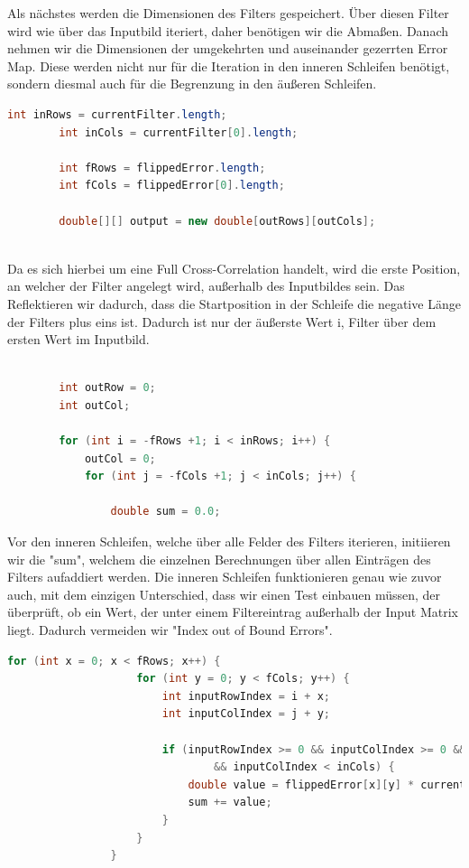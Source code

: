 \documentclass[12pt]{article}
\begin{document}
Als nächstes werden die Dimensionen des Filters gespeichert. Über diesen Filter wird wie über das Inputbild iteriert, daher benötigen wir die Abmaßen. Danach nehmen wir die Dimensionen der umgekehrten und auseinander gezerrten Error Map. Diese werden nicht nur für die Iteration in den inneren Schleifen benötigt, sondern diesmal auch für die Begrenzung in den äußeren Schleifen. 
\begin{lstlisting}[language=Java]
        int inRows = currentFilter.length;
        int inCols = currentFilter[0].length;

        int fRows = flippedError.length;
        int fCols = flippedError[0].length;

        double[][] output = new double[outRows][outCols];
        
\end{lstlisting}
        Da es sich hierbei um eine Full Cross-Correlation handelt, wird die erste Position, an welcher der Filter angelegt wird, außerhalb des Inputbildes sein. Das Reflektieren wir dadurch, dass die Startposition in der Schleife die negative Länge der Filters plus eins ist. Dadurch ist nur der äußerste Wert i, Filter über dem ersten Wert im Inputbild.
\begin{lstlisting}[language=Java]

        int outRow = 0;
        int outCol;

        for (int i = -fRows +1; i < inRows; i++) {
            outCol = 0;
            for (int j = -fCols +1; j < inCols; j++) {

                double sum = 0.0;

\end{lstlisting}
Vor den inneren Schleifen, welche über alle Felder des Filters iterieren, initiieren wir die "sum", welchem die einzelnen Berechnungen über allen Einträgen des Filters aufaddiert werden. Die inneren Schleifen funktionieren genau wie zuvor auch, mit dem einzigen Unterschied, dass wir einen Test einbauen müssen, der überprüft, ob ein Wert, der unter einem Filtereintrag außerhalb der Input Matrix liegt. Dadurch vermeiden wir "Index out of Bound Errors".
\begin{lstlisting}[language=Java]
                for (int x = 0; x < fRows; x++) {
                    for (int y = 0; y < fCols; y++) {
                        int inputRowIndex = i + x;
                        int inputColIndex = j + y;

                        if (inputRowIndex >= 0 && inputColIndex >= 0 && inputRowIndex < inRows
                                && inputColIndex < inCols) {
                            double value = flippedError[x][y] * currentFilter[inputRowIndex][inputColIndex];
                            sum += value;
                        }
                    }
                }
                
\end{lstlisting}
\end{document}
